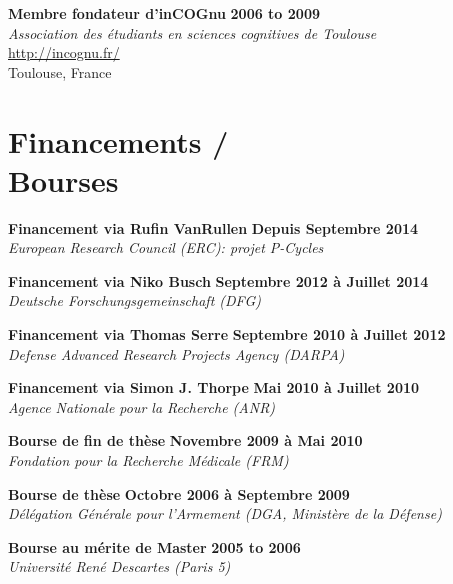 \documentclass[margin,line]{resume}
\begin{document}
\begin{resume}
	\vspace{-2mm} 
	\textbf{Membre fondateur d'inCOGnu} \hfill \textbf{2006 to 2009}\\
	\textsl{Association des étudiants en sciences cognitives de Toulouse}\\
	 \url{http://incognu.fr/}\\
	Toulouse, France	


\vspace{3mm}
    \section{\mysidestyle Financements /\\Bourses}

 	\textbf{Financement via Rufin VanRullen} \hfill \textbf{Depuis Septembre 2014}\\
 	\textsl{European Research Council (ERC): projet P-Cycles}
 
	\vspace{-2mm} 
	\textbf{Financement via Niko Busch} \hfill \textbf{Septembre 2012 à Juillet 2014}\\
	\textsl{Deutsche Forschungsgemeinschaft (DFG)}

	\vspace{-2mm} 
	\textbf{Financement via Thomas Serre} \hfill \textbf{Septembre 2010 à Juillet 2012}\\
	\textsl{Defense Advanced Research Projects Agency (DARPA)}

	\vspace{-2mm} 
	\textbf{Financement via Simon J. Thorpe} \hfill \textbf{Mai 2010 à Juillet 2010}\\
	\textsl{Agence Nationale pour la Recherche (ANR)}
		
	\vspace{-2mm} 
	\textbf{Bourse de fin de thèse} \hfill \textbf{Novembre 2009 à Mai 2010}\\
	\textsl{Fondation pour la Recherche Médicale (FRM)}
		
	\vspace{-2mm} 
	\textbf{Bourse de thèse} \hfill \textbf{Octobre 2006 à Septembre 2009}\\ %
	\textsl{Délégation Générale pour l'Armement (DGA, Ministère de la Défense)}
	
	\vspace{-2mm} 
	\textbf{Bourse au mérite  de Master} \hfill \textbf{2005 to 2006}\\
	\textsl{Université René Descartes (Paris 5)}	




\end{resume}
\end{document}
